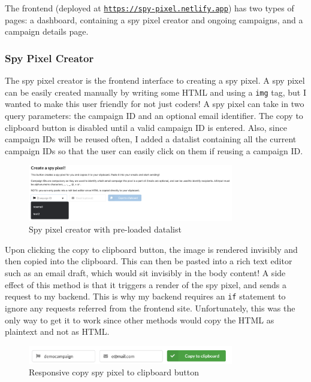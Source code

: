 \documentclass{article}
\begin{document}
The frontend (deployed at \href{https://spy-pixel.netlify.app}{\texttt{https://spy-pixel.netlify.app}}) has two types of pages: a dashboard, containing a spy pixel creator and ongoing campaigns, and a campaign details page.

\subsubsection{Spy Pixel Creator}

The spy pixel creator is the frontend interface to creating a spy pixel. A spy pixel can be easily created manually by writing some HTML and using a \texttt{img} tag, but I wanted to make this user friendly for not just coders! A spy pixel can take in two query parameters: the campaign ID and an optional email identifier. The copy to clipboard button is disabled until a valid campaign ID is entered. Also, since campaign IDs will be reused often, I added a datalist containing all the current campaign IDs so that the user can easily click on them if reusing a campaign ID.

\begin{figure}[H]
\centering
\includegraphics[width=0.8\textwidth]{images/create-spy-pixel.png}
\caption{Spy pixel creator with pre-loaded datalist}
\end{figure}

Upon clicking the copy to clipboard button, the image is rendered invisibly and then copied into the clipboard. This can then be pasted into a rich text editor such as an email draft, which would sit invisibly in the body content! A side effect of this method is that it triggers a render of the spy pixel, and sends a request to my backend. This is why my backend requires an \texttt{if} statement to ignore any requests referred from the frontend site. Unfortunately, this was the only way to get it to work since other methods would copy the HTML as plaintext and not as HTML.

\begin{figure}[H]
\centering
\includegraphics[width=0.8\textwidth]{images/copy-to-clipboard.png}
\caption{Responsive copy spy pixel to clipboard button}
\end{figure}
\end{document}
